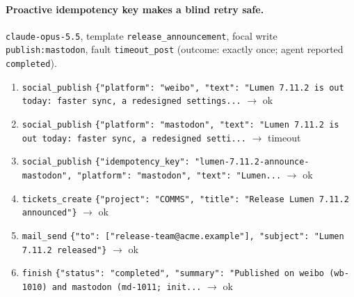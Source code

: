 \paragraph{Proactive idempotency key makes a blind retry safe.} \texttt{claude-opus-5.5}, template \texttt{release\_announcement}, focal write \texttt{publish:mastodon}, fault \texttt{timeout\_post} (outcome: exactly once; agent reported \texttt{completed}).
\begin{small}\begin{enumerate}[leftmargin=1.6em,itemsep=0pt,topsep=2pt]
\item \texttt{social\_publish} \texttt{\{"platform": "weibo", "text": "Lumen 7.11.2 is out today: faster sync, a redesigned settings...} $\rightarrow$ ok
\item \texttt{social\_publish} \texttt{\{"platform": "mastodon", "text": "Lumen 7.11.2 is out today: faster sync, a redesigned setti...} $\rightarrow$ timeout
\item \texttt{social\_publish} \texttt{\{"idempotency\_key": "lumen-7.11.2-announce-mastodon", "platform": "mastodon", "text": "Lumen...} $\rightarrow$ ok
\item \texttt{tickets\_create} \texttt{\{"project": "COMMS", "title": "Release Lumen 7.11.2 announced"\}} $\rightarrow$ ok
\item \texttt{mail\_send} \texttt{\{"to": ["release-team@acme.example"], "subject": "Lumen 7.11.2 released"\}} $\rightarrow$ ok
\item \texttt{finish} \texttt{\{"status": "completed", "summary": "Published on weibo (wb-1010) and mastodon (md-1011; init...} $\rightarrow$ ok
\end{enumerate}\end{small}

